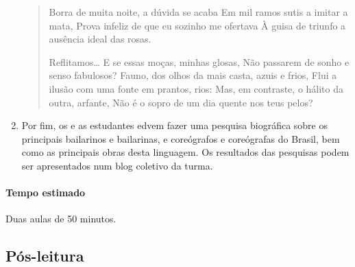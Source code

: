 \documentclass[12pt]{extarticle}
\begin{document}
\begin{enumerate}
\begin{verse}
Borra de muita noite, a dúvida se acaba
Em mil ramos sutis a imitar a mata,
Prova infeliz de que eu sozinho me ofertava
À guisa de triunfo a ausência ideal das rosas.

Reflitamos…
                 E se essas moças, minhas glosas,
Não passarem de sonho e senso fabulosos?
Fauno, dos olhos da mais casta, azuis e frios,
Flui a ilusão com uma fonte em prantos, rios:
Mas, em contraste, o hálito da outra, arfante,
Não é o sopro de um dia quente nos teus pelos?
\end{verse}


  \item
  Por fim, os e as estudantes edvem fazer uma pesquisa biográfica
  sobre os principais bailarinos e bailarinas, e coreógrafos 
  e coreógrafas do Brasil, bem como as principais obras desta linguagem. 
  Os resultados das pesquisas podem ser apresentados num blog coletivo da
  turma.

\end{enumerate}

\paragraph{Tempo estimado} Duas aulas de 50 minutos.











\subsection{Pós-leitura}

\end{document}
